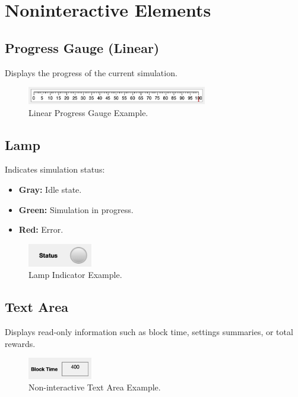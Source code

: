 \section{Noninteractive Elements}
\subsection{Progress Gauge (Linear)}
Displays the progress of the current simulation.
\begin{figure}[H]
    \centering
    \includegraphics[width=0.7\textwidth]{figs/progress_gauge_image.png}
    \caption{Linear Progress Gauge Example.}
    \label{fig:progress_gauge}
\end{figure}

\subsection{Lamp} \label{sec:status_lamp}
Indicates simulation status:
\begin{itemize}
    \item \textbf{Gray:} Idle state.
    \item \textbf{Green:} Simulation in progress.
    \item \textbf{Red:} Error.
\end{itemize}
\begin{figure}[H]
    \centering
    \includegraphics[width=0.25\textwidth]{figs/lamp_image_grey.png}
    \caption{Lamp Indicator Example.}
    \label{fig:lamp}
\end{figure}

\subsection{Text Area}
Displays read-only information such as block time, settings summaries, or total rewards.
\begin{figure}[H]
    \centering
    \includegraphics[width=0.25\textwidth]{figs/noninteractive_text_area_image.png}
    \caption{Non-interactive Text Area Example.}
    \label{fig:noninteractive_text_area}
\end{figure}